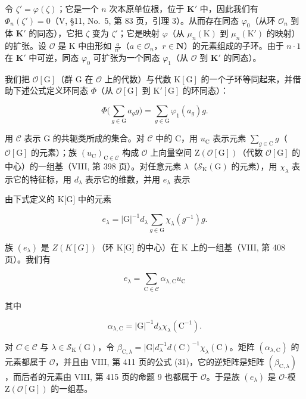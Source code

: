 令 \(\zeta' = \varphi(\zeta)\)；它是一个 \(n\) 次本原单位根，位于 \(\mathbf{K}'\) 中，因此我们有 \(\Phi_n(\zeta') = 0\)（V, §11, No.~5, 第 83 页，引理 3）。从而存在同态 \(\varphi_0\)（从环 \(\mathcal{O}_n\) 到体 \(\mathbf{K}'\) 的同态），它把 \(\zeta\) 变为 \(\zeta'\)；它是映射 \(\varphi\)（从 \(\mu_n(\mathrm{K})\) 到 \(\mu_n(\mathrm{K}')\) 的映射）的扩张。设 \(\mathcal{O}\) 是 \(\mathrm{K}\) 中由形如 \(\frac{a}{n^r}\)（\(a \in \mathcal{O}_n\)，\(r \in \mathbf{N}\)）的元素组成的子环。由于 \(n \cdot 1\) 在 \(\mathbf{K}'\) 中可逆，同态 \(\varphi_0\) 可扩张为一个同态 \(\varphi_1\)（从 \(\mathcal{O}\) 到 \(\mathbf{K}'\) 的同态）。

我们把 \(\mathcal{O}[\mathrm{G}]\)（群 \(\mathrm{G}\) 在 \(\mathcal{O}\) 上的代数）与代数 \(\mathrm{K}[\mathrm{G}]\) 的一个子环等同起来，并借助下述公式定义环同态 \(\Phi\)（从 \(\mathcal{O}[\mathrm{G}]\) 到 \(\mathrm{K}'[\mathrm{G}]\) 的环同态）：

\[
\Phi \bigg (\sum_ {g \in \mathrm{G}} a _ {g} g \bigg) = \sum_ {g \in \mathrm{G}} \varphi_ {1} (a _ {g}) g.\tag{42}
\]

用 \(\mathcal{C}\) 表示 G 的共轭类所成的集合。对 \(\mathcal{C}\) 中的 C，用 \(u_{\mathrm{C}}\) 表示元素 \(\sum_{g\in \mathrm{C}}g\)（\(\mathcal{O}[\mathrm{G}]\) 的元素）；族 \((u_{\mathrm{C}})_{\mathrm{C}\in \mathcal{C}}\) 构成 \(\mathcal{O}\) 上向量空间 \(\mathrm{Z}(\mathcal{O}[\mathrm{G}])\)（代数 \(\mathcal{O}[\mathrm{G}]\) 的中心）的一组基（VIII, 第 398 页）。对任意元素 \(\lambda\)（\(\mathcal{S}_{\mathrm{K}}(\mathrm{G})\) 的元素），用 \(\chi_{\lambda}\) 表示它的特征标，用 \(d_{\lambda}\) 表示它的维数，并用 \(e_{\lambda}\) 表示

由下式定义的 K{[}G{]} 中的元素

\[
e _ {\lambda} = | \mathrm{G} | ^ {- 1} d _ {\lambda} \sum_ {g \in \mathrm{G}} \chi_ {\lambda} (g ^ {- 1}) g.\tag{43}
\]

族 \((e_{\lambda})\) 是 \(Z(K[G])\)（环 K{[}G{]} 的中心）在 K 上的一组基（VIII, 第 408 页）。我们有

\[
e _ {\lambda} = \sum_ {\mathrm{C} \in \mathcal {C}} \alpha_ {\lambda , \mathrm{C}} u _ {\mathrm{C}}\tag{44}
\]

其中

\[
\alpha_ {\lambda , \mathrm{C}} = | \mathrm{G} | ^ {- 1} d _ {\lambda} \chi_ {\lambda} (\mathrm{C} ^ {- 1}).\tag{45}
\]

对 \(C \in \mathcal{C}\) 与 \(\lambda \in \mathcal{S}_{\mathrm{K}}(\mathrm{G})\)，令 \(\beta_{\mathrm{C},\lambda} = |\mathrm{G}| d_{\lambda}^{-1} d(\mathrm{C})^{-1} \chi_{\lambda}(\mathrm{C})\)。矩阵 \((\alpha_{\lambda,\mathrm{C}})\) 的元素都属于 \(\mathcal{O}\)，并且由 VIII, 第 411 页的公式 (31)，它的逆矩阵是矩阵 \((\beta_{\mathrm{C},\lambda})\)，而后者的元素由 VIII, 第 415 页的命题 9 也都属于 \(\mathcal{O}\)。于是族 \((e_{\lambda})\) 是 \(\mathcal{O}\)-模 \(\mathrm{Z}(\mathcal{O}[\mathrm{G}])\) 的一组基。

